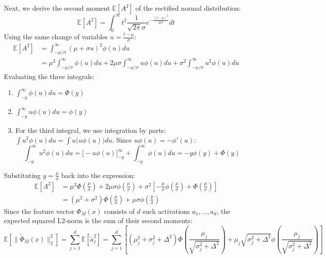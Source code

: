 \documentclass{article}
\theoremstyle{plain}
\theoremstyle{definition}
\theoremstyle{remark}
\begin{document}
Next, we derive the second moment $\mathbb{E}[A^2]$ of the rectified normal distribution:
\begin{equation}
\mathbb{E}[A^2] = \int_{0}^{\infty} t^2 \frac{1}{\sqrt{2\pi}\sigma} e^{-\frac{(t-\mu)^2}{2\sigma^2}} dt
\end{equation}
Using the same change of variables $u = \frac{t-\mu}{\sigma}$:
\begin{align}
\mathbb{E}[A^2] &= \int_{-\mu/\sigma}^{\infty} (\mu + \sigma u)^2 \phi(u) du \nonumber \\
&= \mu^2 \int_{-\mu/\sigma}^{\infty} \phi(u) du + 2\mu\sigma \int_{-\mu/\sigma}^{\infty} u\phi(u) du + \sigma^2 \int_{-\mu/\sigma}^{\infty} u^2 \phi(u) du
\end{align}
Evaluating the three integrals:
\begin{enumerate}
    \item $\int_{-y}^{\infty} \phi(u) du = \Phi(y)$
    \item $\int_{-y}^{\infty} u\phi(u) du = \phi(y)$
    \item For the third integral, we use integration by parts: $\int u^2 \phi(u) du = \int u \big(u\phi(u)\big) du$. Since $u\phi(u) = -\phi'(u)$:
    \begin{equation}
    \int_{-y}^{\infty} u^2 \phi(u) du = \big[-u\phi(u)\big]_{-y}^{\infty} + \int_{-y}^{\infty} \phi(u) du = -y\phi(y) + \Phi(y)
    \end{equation}
\end{enumerate}
Substituting $y = \frac{\mu}{\sigma}$ back into the expression:
\begin{align}
\mathbb{E}[A^2] &= \mu^2 \Phi\left(\frac{\mu}{\sigma}\right) + 2\mu\sigma \phi\left(\frac{\mu}{\sigma}\right) + \sigma^2 \left[ -\frac{\mu}{\sigma}\phi\left(\frac{\mu}{\sigma}\right) + \Phi\left(\frac{\mu}{\sigma}\right) \right] \nonumber \\
&= (\mu^2 + \sigma^2)\Phi\left(\frac{\mu}{\sigma}\right) + \mu\sigma \phi\left(\frac{\mu}{\sigma}\right)
\end{align}
Since the feature vector $\Phi_M(x)$ consists of $d$ such activations $a_1, \dots, a_d$, the expected squared L2-norm is the sum of their second moments:
\begin{equation}
\mathbb{E}[\|\tilde{\Phi}_M(x)\|_2^2] = \sum_{j=1}^d \mathbb{E}[\tilde{a}_j^2] = \sum_{j=1}^d \left[ (\mu_j^2 + \sigma_j^2 + \Delta^2)\Phi\left(\frac{\mu_j}{\sqrt{\sigma_j^2 + \Delta^2}}\right) + \mu_j \sqrt{\sigma_j^2 + \Delta^2} \phi\left(\frac{\mu_j}{\sqrt{\sigma_j^2 + \Delta^2}}\right) \right]
\end{equation}
\end{document}
